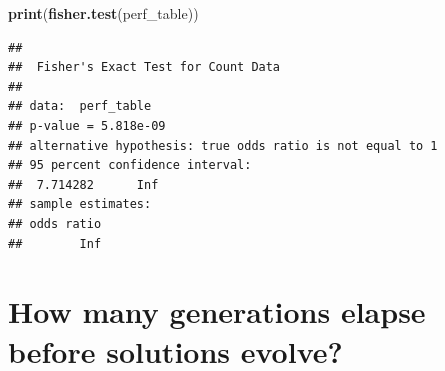 \documentclass[
]{book}
\newenvironment{Shaded}{\begin{snugshade}}{\end{snugshade}}
\newcommand{\KeywordTok}[1]{\textcolor[rgb]{0.13,0.29,0.53}{\textbf{#1}}}
\newcommand{\NormalTok}[1]{#1}
\begin{document}
\begin{Shaded}
\begin{Highlighting}[]
\KeywordTok{print}\NormalTok{(}\KeywordTok{fisher.test}\NormalTok{(perf\_table))}
\end{Highlighting}
\end{Shaded}

\begin{verbatim}
## 
##  Fisher's Exact Test for Count Data
## 
## data:  perf_table
## p-value = 5.818e-09
## alternative hypothesis: true odds ratio is not equal to 1
## 95 percent confidence interval:
##  7.714282      Inf
## sample estimates:
## odds ratio 
##        Inf
\end{verbatim}

\hypertarget{how-many-generations-elapse-before-solutions-evolve-1}{%
\section{How many generations elapse before solutions evolve?}\label{how-many-generations-elapse-before-solutions-evolve-1}}
\end{document}
